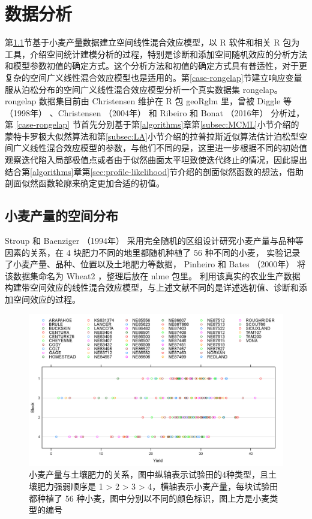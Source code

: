 \documentclass[12pt,a4paper,UTF8,twoside]{book}
\theoremstyle{definition}
\theoremstyle{definition}
\theoremstyle{definition}
\theoremstyle{remark}
\begin{document}
\hypertarget{applications}{%
\chapter{数据分析}\label{applications}}

第\ref{sec:spatial-random-effects}节基于小麦产量数据建立空间线性混合效应模型，以 R 软件和相关 R 包为工具，介绍空间统计建模分析的过程，特别是诊断和添加空间随机效应的分析方法和模型参数初值的确定方式。这个分析方法和初值的确定方式具有普适性，对于更复杂的空间广义线性混合效应模型也是适用的。第\ref{case-rongelap}节建立响应变量服从泊松分布的空间广义线性混合效应模型分析一个真实数据集 rongelap。rongelap 数据集目前由 Christensen 维护在 R 包 geoRglm 里，曾被 Diggle 等 （1998年） \citep{Diggle1998} 、Christensen （2004年） \citep{Christensen2004} 和 Ribeiro 和 Bonat （2016年） \citep{Bonat2016Practical} 分析过，第 \ref{case-rongelap} 节首先分别基于第\ref{algorithms}章第\ref{subsec:MCML}小节介绍的蒙特卡罗极大似然算法和第\ref{subsec:LA}小节介绍的拉普拉斯近似算法估计泊松型空间广义线性混合效应模型的参数，与他们不同的是，这里进一步根据不同的初始值观察迭代陷入局部极值点或者由于似然曲面太平坦致使迭代终止的情况，因此提出结合第\ref{algorithms}章第\ref{sec:profile-likelihood}节介绍的剖面似然函数的想法，借助剖面似然函数轮廓来确定更加合适的初值。

\hypertarget{sec:spatial-random-effects}{%
\section{小麦产量的空间分布}\label{sec:spatial-random-effects}}

Stroup 和 Baenziger （1994年） \citep{Stroup1994} 采用完全随机的区组设计研究小麦产量与品种等因素的关系，在 4 块肥力不同的地里都随机种植了 56 种不同的小麦， 实验记录了小麦产量、品种、位置以及土地肥力等数据， Pinheiro 和 Bates （2000年） \citep{Pinheiro2000} 将该数据集命名为 Wheat2 ，整理后放在 nlme 包里。 利用该真实的农业生产数据构建带空间效应的线性混合效应模型，与上述文献不同的是详述选初值、诊断和添加空间效应的过程。

\begin{figure}

{\centering \includegraphics[width=0.7\linewidth]{figures/Yields-Block} 

}

\caption{小麦产量与土壤肥力的关系，图中纵轴表示试验田的4种类型，且土壤肥力强弱顺序是 1 > 2 > 3 > 4，横轴表示小麦产量，每块试验田都种植了 56 种小麦，图中分别以不同的颜色标识，图上方是小麦类型的编号}\label{fig:yields-block}
\end{figure}
\end{document}
